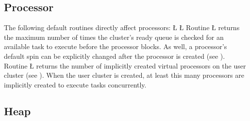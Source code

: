 \documentclass[openright,twoside]{report}
\begin{document}
\subsection{Processor}

The following default routines directly affect processors:
\LGinlinefalse\LGbegin\lgrinde
\L{}
\CE{}\L{}
\CE{}\endlgrinde\LGend
{}%
%
%
%
Routine \LGinlinetrue\LGbegin\lgrinde\L{}\endlgrinde\LGend{} returns the maximum number of times the cluster's ready queue is checked for an available task to execute before the processor blocks.
As well, a processor's default spin can be explicitly changed after the processor is created (see ).
Routine \LGinlinetrue\LGbegin\lgrinde\L{}\endlgrinde\LGend{} returns the number of implicitly created virtual processors on the user cluster (see ).
When the user cluster is created, at least this many processors are implicitly created to execute tasks concurrently.


\subsection{Heap}
\label{s:DefaultValuesHeap}
\end{document}

